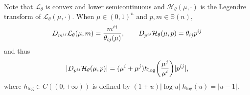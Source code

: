 \documentclass[10pt]{article}
\numberwithin{equation}{section}
\newcommand{\cH}{ \mathcal{H}}
\newcommand{\cL}{ \mathcal{L}}
\newcommand{\bS}{\mathbb S}
\def\cH{\mathcal{H}}
\def\cL{\mathcal{L}}
\begin{document}
Note that $\cL_\theta$ is convex and lower semicontinuous and $\cH_\theta(\mu, \cdot)$ is the Legendre transform of $\cL_\theta(\mu, \cdot)$. 
When $\mu \in (0,1)^n$ and $p, m \in \bS(n)$,   
\[
D_{m^{ij}}  \cL_\theta(\mu, m)= {m^{ij} \over \theta_{ij}(\mu)}, \qquad D_{p^{ij} } \cH_\theta(\mu, p)=\theta_{ij}p^{ij}
\]
and thus 
\begin{equation}\label{eq:dec21.2025.2}
|D_{p^{ij} } \cH_\theta(\mu, p)| =(\mu^i+\mu^j) h_{\log}\bigg({\mu^j \over \mu^i} \bigg)|p^{ij}|,
\end{equation}
where $ h_{\log} \in C((0,+\infty))$ is defined by $(1+u) |\log u|\; h_{\log}(u)= |u-1|.$

%
%
\end{document}
